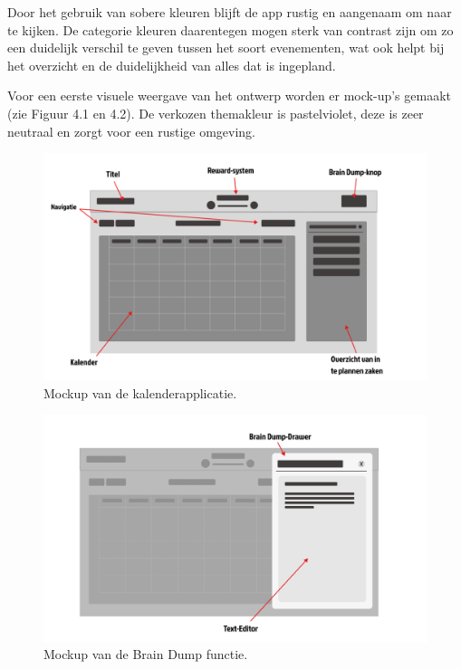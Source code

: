 Door het gebruik van sobere kleuren blijft de app rustig en aangenaam om naar te kijken. De categorie kleuren daarentegen mogen sterk van contrast zijn om zo een duidelijk verschil te geven tussen het soort evenementen, wat ook helpt bij het overzicht en de duidelijkheid van alles dat is ingepland. \newline

Voor een eerste visuele weergave van het ontwerp worden er mock-up’s gemaakt (zie Figuur 4.1 en 4.2). De verkozen themakleur is pastelviolet, deze is zeer neutraal en zorgt voor een rustige omgeving.

\begin{figure}[h]
    \centering
    \includegraphics[width=\textwidth]{graphics/mockup_kalender.png}
    \caption{Mockup van de kalenderapplicatie.}
    \label{fig:mockup_app}
\end{figure}

\begin{figure}[h]
    \centering
    \includegraphics[width=\textwidth]{graphics/mockup_braindump.png} 
    \caption{Mockup van de Brain Dump functie.}
    \label{fig:mockup_braindump}
\end{figure}


